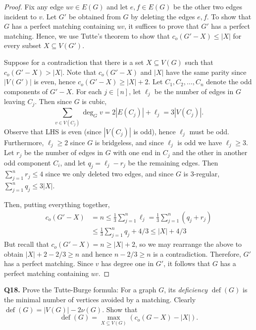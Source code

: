 \begin{proof}
Fix any edge \( uv \in E(G) \) and let \( e,f \in E(G) \) be the other two edges incident to \( v \). Let \( G' \) be obtained from \( G \) by deleting the edges \( e,f \). To show that \( G \) has a perfect matching containing \( uv \), it suffices to prove that \( G' \) has a perfect matching. Hence, we use Tutte's theorem to show that \( c_{o} (G' - X) \leq |X| \) for every subset \( X \subseteq V(G') \).

Suppose for a contradiction that there is a set \( X \subseteq V(G) \) such that \( c_{o} (G' - X) > |X| \). Note that \( c_{o} (G' - X) \) and \( |X| \) have the same parity since \( |V(G')| \) is even, hence \( c_{o} (G' - X) \geq |X| + 2 \). Let \( C_1, C_2, \hdots , C_{n}  \) denote the odd components of \( G' - X \). For each \( j \in [n] \), let \( \ell_{j}  \) be the number of edges in \( G \) leaving \( C_{j}  \). Then since \( G \) is cubic, \[ \sum_{v \in V(C_{j})}^{} \deg_{G} v = 2 |E(C_{j})| + \ell_{j} = 3 |V(C_{j})|. \] Observe that LHS is even (since \( |V(C_{j})| \) is odd), hence \( \ell_{j} \) must be odd. Furthermore, \( \ell_{j} \geq 2 \) since \( G \) is bridgeless, and since \( \ell_{j}  \) is odd we have \( \ell_{j} \geq 3 \). Let \( r_{j} \) be the number of edges in \( G \) with one end in \( C_{j}  \) and the other in another odd component \( C_{i}  \), and let \( q_{j} = \ell_{j} - r_{j}  \) be the remaining edges. Then \( \sum_{j=1}^{n} r_{j} \leq 4 \) since we only deleted two edges, and since \( G \) is 3-regular, \( \sum_{j=1}^{n} q_{j} \leq 3|X|  \). 

Then, putting everything together,
\begin{align*}
	c_{o} (G' - X) &= n \leq \frac{1}{3} \sum_{j=1}^{n} \ell_{j} = \frac{1}{3} \sum_{j=1}^{n} (q_{j} + r_{j}) \\
	 &\leq \frac{1}{3}\sum_{j=1}^{n} q_{j} + 4/3 \leq |X| + 4/3
\end{align*}
But recall that \( c_{o} (G' - X) = n \geq |X| + 2\), so we may rearrange the above to obtain \( |X| + 2 - 2/3 \geq n \) and hence \( n - 2/3 \geq n \) is a contradiction. Therefore, \( G' \) has a perfect matching. Since \( v \) has degree one in \( G' \), it follows that \( G \) has a perfect matching containing \( uv \). 
\end{proof}
\noindent \textbf{Q18.} Prove the Tutte-Burge formula: For a graph \( G \), its \emph{deficiency} \( \operatorname{def} (G) \) is the minimal number of vertices avoided by a matching. Clearly \( \operatorname{def} (G) = |V(G)| - 2 \nu (G) \). Show that \[ \operatorname{def} (G) = \max_{X \subseteq V(G)} (c_{o} (G - X) - |X|). \tag{$\ast$} \] 
